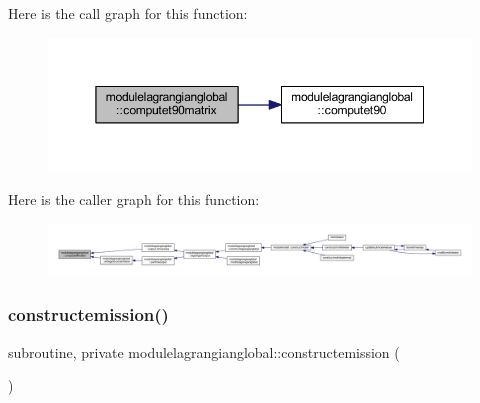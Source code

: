 Here is the call graph for this function\+:\nopagebreak
\begin{figure}[H]
\begin{center}
\leavevmode
\includegraphics[width=350pt]{namespacemodulelagrangianglobal_aa1fa562342fd711319936084593cafbf_cgraph}
\end{center}
\end{figure}
Here is the caller graph for this function\+:\nopagebreak
\begin{figure}[H]
\begin{center}
\leavevmode
\includegraphics[width=350pt]{namespacemodulelagrangianglobal_aa1fa562342fd711319936084593cafbf_icgraph}
\end{center}
\end{figure}
\mbox{\label{namespacemodulelagrangianglobal_a19776a2b14eca267eac2af7e53ce5c77}} 
\subsubsection{\texorpdfstring{constructemission()}{constructemission()}}
{\footnotesize\ttfamily subroutine, private modulelagrangianglobal\+::constructemission (\begin{DoxyParamCaption}{ }\end{DoxyParamCaption})\hspace{0.3cm}{\ttfamily [private]}}

